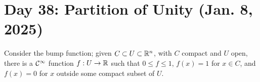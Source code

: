 \section{Day 38: Partition of Unity (Jan. 8, 2025)}
Consider the bump function; given $C \subset U \subset \mathbb R^n$, with $C$ compact and $U$ open, there is a $\mathcal C^\infty$ function $f : U \to \mathbb R$ such that $0 \leq f \leq 1$, $f(x) = 1$ for $x \in C$, and $f(x) = 0$ for $x$ outside some compact subset of $U$. 
